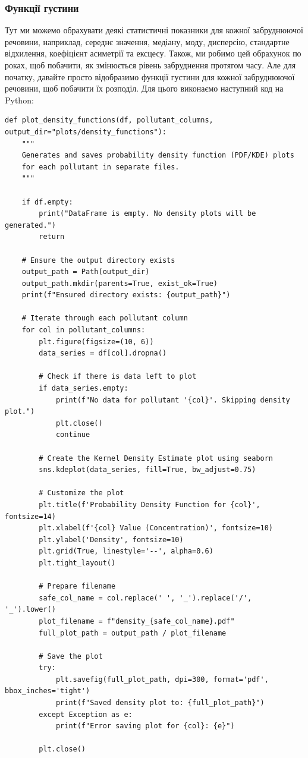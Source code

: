 \documentclass{exam_template}
\begin{document}
\subsubsection{Функції густини}
Тут ми можемо обрахувати деякі статистичні показники для кожної
забруднюючої речовини, наприклад, середнє значення, медіану, моду, дисперсію,
стандартне відхилення, коефіцієнт асиметрії та ексцесу. Також, ми робимо 
цей обрахунок по роках, щоб побачити, як змінюється рівень забруднення
протягом часу. Але для початку, давайте просто відобразимо функції 
густини для кожної забруднюючої речовини, щоб побачити їх розподіл.
Для цього виконаємо наступний код на Python:
\begin{verbatim}
def plot_density_functions(df, pollutant_columns, output_dir="plots/density_functions"):
    """
    Generates and saves probability density function (PDF/KDE) plots
    for each pollutant in separate files.
    """
    
    if df.empty:
        print("DataFrame is empty. No density plots will be generated.")
        return

    # Ensure the output directory exists
    output_path = Path(output_dir)
    output_path.mkdir(parents=True, exist_ok=True)
    print(f"Ensured directory exists: {output_path}")

    # Iterate through each pollutant column
    for col in pollutant_columns:
        plt.figure(figsize=(10, 6))
        data_series = df[col].dropna()

        # Check if there is data left to plot
        if data_series.empty:
            print(f"No data for pollutant '{col}'. Skipping density plot.")
            plt.close()
            continue

        # Create the Kernel Density Estimate plot using seaborn
        sns.kdeplot(data_series, fill=True, bw_adjust=0.75)

        # Customize the plot
        plt.title(f'Probability Density Function for {col}', fontsize=14)
        plt.xlabel(f'{col} Value (Concentration)', fontsize=10)
        plt.ylabel('Density', fontsize=10)
        plt.grid(True, linestyle='--', alpha=0.6)
        plt.tight_layout()

        # Prepare filename
        safe_col_name = col.replace(' ', '_').replace('/', '_').lower()
        plot_filename = f"density_{safe_col_name}.pdf"
        full_plot_path = output_path / plot_filename

        # Save the plot
        try:
            plt.savefig(full_plot_path, dpi=300, format='pdf', bbox_inches='tight')
            print(f"Saved density plot to: {full_plot_path}")
        except Exception as e:
            print(f"Error saving plot for {col}: {e}")

        plt.close()  
\end{verbatim}
\end{document}
